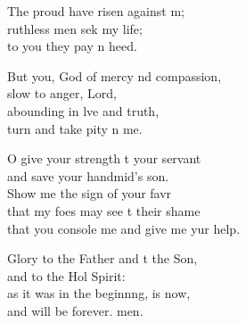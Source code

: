 \begin{psalmverse}
\begin{patverse}
The proud have risen against m;\Flex\\
ruthless men sek my life;\Med\\
to you they pay n heed.

But you, God of mercy nd compassion,\Med\\
slow to anger,  Lord,\\
abounding in lve and truth,\Med\\
turn and take pity n me.

O give your strength t your servant\Med\\
and save your handmid’s son.\\
Show me the sign of your favr\Flex\\
that my foes may see t their shame\Med\\
that you console me and give me yur help.

Glory to the Father and t the Son,\Med\\
and to the Hol Spirit:\\
as it was in the beginnng, is now,\Med\\
and will be forever. men.
  \end{patverse}
\end{psalmverse}
